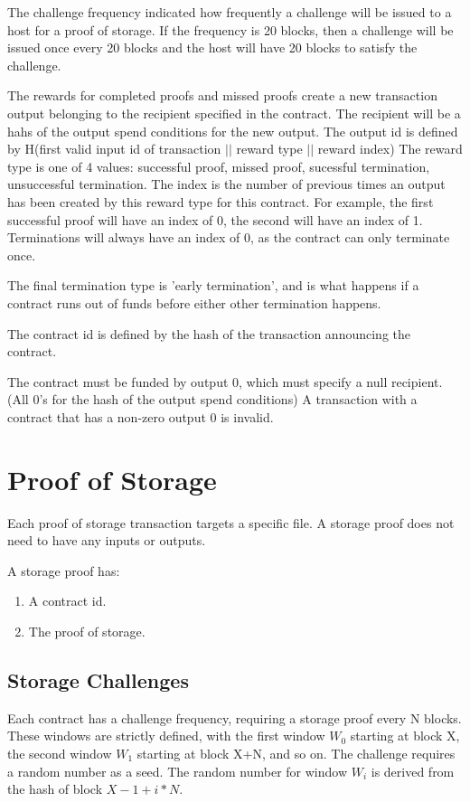 \documentclass[twocolumn]{article}
\begin{document}
The challenge frequency indicated how frequently a challenge will be issued to a host for a proof of storage.
If the frequency is 20 blocks, then a challenge will be issued once every 20 blocks and the host will have 20 blocks to satisfy the challenge.

The rewards for completed proofs and missed proofs create a new transaction output belonging to the recipient specified in the contract.
The recipient will be a hahs of the output spend conditions for the new output.
The output id is defined by H(first valid input id of transaction $||$ reward type $||$ reward index)
The reward type is one of 4 values: successful proof, missed proof, sucessful termination, unsuccessful termination.
The index is the number of previous times an output has been created by this reward type for this contract.
For example, the first successful proof will have an index of 0, the second will have an index of 1.
Terminations will always have an index of 0, as the contract can only terminate once.

The final termination type is 'early termination', and is what happens if a contract runs out of funds before either other termination happens.

The contract id is defined by the hash of the transaction announcing the contract.

The contract must be funded by output 0, which must specify a null recipient. (All 0's for the hash of the output spend conditions)
A transaction with a contract that has a non-zero output 0 is invalid.

\section{Proof of Storage}
Each proof of storage transaction targets a specific file.
A storage proof does not need to have any inputs or outputs.

A storage proof has:
\begin{enumerate}
	\item A contract id.
	\item The proof of storage.
\end{enumerate}

\subsection{Storage Challenges}
Each contract has a challenge frequency, requiring a storage proof every N blocks.
These windows are strictly defined, with the first window $W_0$ starting at block X, the second window $W_1$ starting at block X+N, and so on.
The challenge requires a random number as a seed.
The random number for window $W_i$ is derived from the hash of block $X-1 + i*N$.
\end{document}
